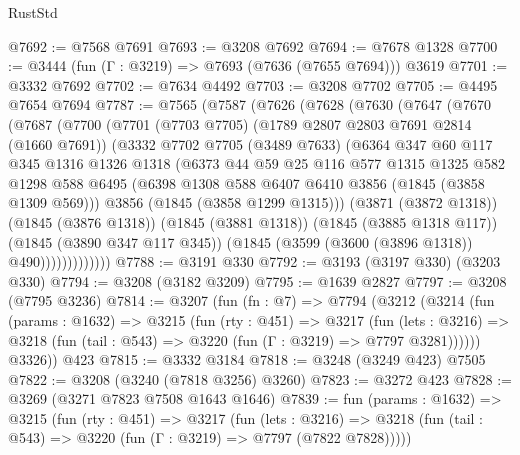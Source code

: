 \begin{lexlean}{RustStd}
\begin{coremodule}
@7692 := @7568 @7691
@7693 := @3208 @7692
@7694 := @7678 @1328
@7700 := @3444 (fun (Γ : @3219) => @7693 (@7636 (@7655 @7694))) @3619
@7701 := @3332 @7692
@7702 := @7634 @4492
@7703 := @3208 @7702
@7705 := @4495 @7654 @7694
@7787 := @7565
    (@7587
      (@7626
        (@7628
          (@7630
            (@7647
              (@7670
                (@7687
                  (@7700
                    (@7701
                      (@7703 @7705)
                      (@1789 @2807 @2803 @7691 @2814 (@1660 @7691))
                      (@3332
                        @7702
                        @7705
                        (@3489 @7633)
                        (@6364
                          @347
                          @60
                          @117
                          @345
                          @1316
                          @1326
                          @1318
                          (@6373
                            @44
                            @59
                            @25
                            @116
                            @577
                            @1315
                            @1325
                            @582
                            @1298
                            @588
                            @6495
                            (@6398 @1308 @588 @6407 @6410 @3856 (@1845 (@3858 @1309 @569)))
                            @3856
                            (@1845 (@3858 @1299 @1315)))
                          (@3871 (@3872 @1318))
                          (@1845 (@3876 @1318))
                          (@1845 (@3881 @1318))
                          (@1845 (@3885 @1318 @117))
                          (@1845 (@3890 @347 @117 @345))
                          (@1845 (@3599 (@3600 (@3896 @1318)) @490)))))))))))))
@7788 := @3191 @330
@7792 := @3193 (@3197 @330) (@3203 @330)
@7794 := @3208 (@3182 @3209)
@7795 := @1639 @2827
@7797 := @3208 (@7795 @3236)
@7814 := @3207
    (fun (fn : @7) =>
    @7794
      (@3212
        (@3214
          (fun (params : @1632) =>
          @3215
            (fun (rty : @451) =>
            @3217
              (fun (lets : @3216) =>
              @3218 (fun (tail : @543) => @3220 (fun (Γ : @3219) => @7797 @3281))))))
        @3326))
    @423
@7815 := @3332 @3184
@7818 := @3248 (@3249 @423) @7505
@7822 := @3208 (@3240 (@7818 @3256) @3260)
@7823 := @3272 @423
@7828 := @3269 (@3271 @7823 @7508 @1643 @1646)
@7839 := fun (params : @1632) =>
  @3215
    (fun (rty : @451) =>
    @3217
      (fun (lets : @3216) =>
      @3218 (fun (tail : @543) => @3220 (fun (Γ : @3219) => @7797 (@7822 @7828)))))

\end{coremodule}
\end{lexlean}
